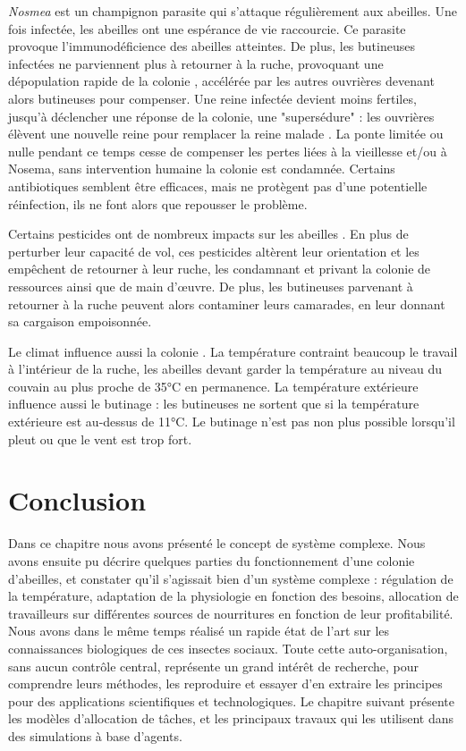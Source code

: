 		\textit{Nosmea} est un champignon parasite qui s'attaque régulièrement aux abeilles. Une fois infectée, les abeilles ont une espérance de vie raccourcie. Ce parasite provoque l'immunodéficience des abeilles atteintes. De plus, les butineuses infectées ne parviennent plus à retourner à la ruche, provoquant une dépopulation rapide de la colonie \cite{higes_how_2008}, accélérée par les autres ouvrières devenant alors butineuses pour compenser. Une reine infectée devient moins fertiles, jusqu'à déclencher une réponse de la colonie, une "supersédure" : les ouvrières élèvent une nouvelle reine pour remplacer la reine malade \cite{alaux_pathological_2011}. La ponte limitée ou nulle pendant ce temps cesse de compenser les pertes liées à la vieillesse et/ou à Nosema, sans intervention humaine la colonie est condamnée. Certains antibiotiques semblent être efficaces, mais ne protègent pas d'une potentielle réinfection, ils ne font alors que repousser le problème.
		
		Certains pesticides ont de nombreux impacts sur les abeilles \cite{betti_bee_2017}. En plus de perturber leur capacité de vol, ces pesticides altèrent leur orientation et les empêchent de retourner à leur ruche, les condamnant et privant la colonie de ressources ainsi que de main d'œuvre. De plus, les butineuses parvenant à retourner à la ruche peuvent alors contaminer leurs camarades, en leur donnant sa cargaison empoisonnée.
		
		Le climat influence aussi la colonie \cite{riviere_toward_2018}. La température contraint beaucoup le travail à l'intérieur de la ruche, les abeilles devant garder la température au niveau du couvain au plus proche de 35°C en permanence. La température extérieure influence aussi le butinage : les butineuses ne sortent que si la température extérieure est au-dessus de 11°C. Le butinage n'est pas non plus possible lorsqu'il pleut ou que le vent est trop fort.
		
			
			
		\section*{Conclusion}
			
		Dans ce chapitre nous avons présenté le concept de système complexe. Nous avons ensuite pu décrire quelques parties du fonctionnement d'une colonie d'abeilles, et constater qu'il s'agissait bien d'un système complexe : régulation de la température, adaptation de la physiologie en fonction des besoins, allocation de travailleurs sur différentes sources de nourritures en fonction de leur profitabilité. Nous avons dans le même temps réalisé un rapide état de l'art sur les connaissances biologiques de ces insectes sociaux. Toute cette auto-organisation, sans aucun contrôle central, représente un grand intérêt de recherche, pour comprendre leurs méthodes, les reproduire et essayer d'en extraire les principes pour des applications scientifiques et technologiques. Le chapitre suivant présente les modèles d'allocation de tâches, et les principaux travaux qui les utilisent dans des simulations à base d'agents.
